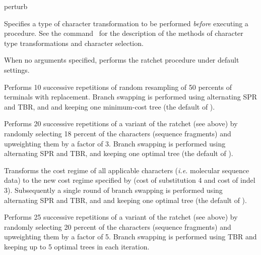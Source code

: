 \begin{command}{perturb}{}
\begin{arguments}
            {Specifies a type of character transformation to be performed
            \emph{before} executing a  procedure.
            See the command~ for
            the description of the methods of character type transformations
            and character selection.}
            {}

	\end{arguments}

        {When no arguments specified, \poy performs the ratchet procedure under default
        settings.}
	
	\begin{poyexamples}
	
	{Performs 10 successive repetitions of random resampling of 50 percents of
	terminals with replacement. Branch swapping is performed using
	alternating SPR and TBR, and and keeping one minimum-cost
	tree (the default of ).}
	
            {Performs 20 successive repetitions of a variant of the ratchet (see
            above) by randomly selecting 18 percent of the characters (sequence
            fragments) and upweighting them by a factor of 3. Branch swapping is
            performed using alternating SPR and TBR, and keeping one
            optimal tree (the default of ).}

            {Transforms the cost regime of all applicable characters (\emph{i.e.} molecular 
            sequence data) to the new cost regime specified by
             (cost of substitution 4 and cost of indel 3).
            Subsequently a single round of branch swapping is
            performed using alternating SPR and TBR, and and keeping one
            optimal tree (the default of ).}
            
            {Performs 25 successive repetitions of a variant of the ratchet (see
            above) by randomly selecting 20 percent of the characters (sequence
            fragments) and upweighting them by a factor of 5. Branch swapping is
            performed using TBR and keeping up to 5 optimal trees in each iteration.}
            

\end{poyexamples}
\end{command}
